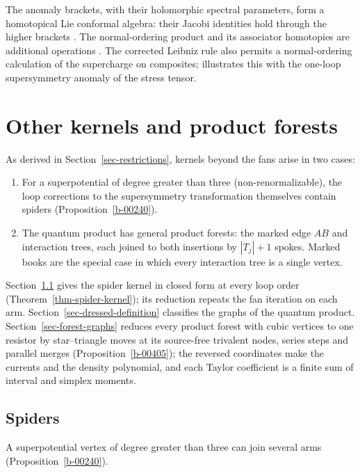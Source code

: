 \documentclass[11pt]{article}
\numberwithin{equation}{section}
\numberwithin{figure}{section}
\numberwithin{table}{section}
\begin{document}
The anomaly brackets, with their holomorphic spectral parameters, form a homotopical Lie conformal algebra: their Jacobi identities hold through the higher brackets \cite[Sections 4.2--4.5]{higher}. The normal-ordering product and its associator homotopies are additional operations \cite[Section 2.3]{semichiral}. The corrected Leibniz rule also permits a normal-ordering calculation of the supercharge on composites; \cite[Section 3.2]{semichiral} illustrates this with the one-loop supersymmetry anomaly of the stress tensor.

\section{Other kernels and product forests}\label{sec-forests}

As derived in Section~\ref{sec-restrictions}, kernels beyond the fans arise in two cases:

\begin{enumerate}
\item For a superpotential of degree greater than three (non-renormalizable), the loop corrections to the supersymmetry transformation themselves contain spiders (Proposition~\ref{b-00240}).
\item The quantum product has general product forests: the marked edge $AB$ and interaction trees, each joined to both insertions by $|T_j|+1$ spokes. Marked books are the special case in which every interaction tree is a single vertex.
\end{enumerate}

Section~\ref{sec-spiders} gives the spider kernel in closed form at every loop order (Theorem~\ref{thm-spider-kernel}); its reduction repeats the fan iteration on each arm. Section~\ref{sec-dressed-definition} classifies the graphs of the quantum product. Section~\ref{sec-forest-graphs} reduces every product forest with cubic vertices to one resistor by star--triangle moves at its source-free trivalent nodes, series steps and parallel merges (Proposition~\ref{b-00405}); the reversed coordinates make the currents and the density polynomial, and each Taylor coefficient is a finite sum of interval and simplex moments.

\subsection{Spiders}\label{sec-spiders}

A superpotential vertex of degree greater than three can join several arms (Proposition~\ref{b-00240}).
\end{document}
